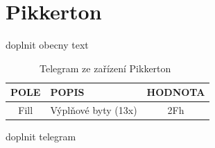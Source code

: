 \section{Pikkerton}

\colorbox[rgb]{1,0,0}{doplnit obecny text}
	
	\begin{table}[!ht]
\centering
\caption{Telegram ze zařízení Pikkerton~\cite{CidloPikkerton}}
\label{TabulkaTelegramPikkerton}
\begin{tabular}{|c|l|c|}
\hline
\textbf{POLE}      & \textbf{POPIS}            & \textbf{HODNOTA} \\ \hline
Fill               & Výplňové byty (13x)                                 & 2Fh              \\ \hline

\end{tabular}%
\end{table}

\colorbox[rgb]{1,0,0}{doplnit telegram}


